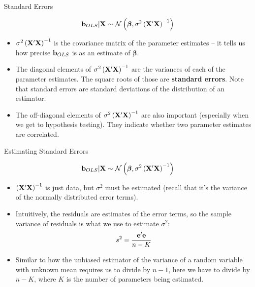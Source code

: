 \begin{frame}{Standard Errors}

\[
	{\bf b}_{OLS} | {\bf X} \sim \mathcal{N}\left(\boldsymbol{\beta},\sigma^{2} \left({\bf X}'{\bf X}  \right)^{-1} \right)
	\]

\begin{itemize}
	\item $\sigma^{2} \left({\bf X}'{\bf X}  \right)^{-1}$ is the covariance matrix of the parameter estimates
	-- it tells us how precise ${\bf b}_{OLS}$ is as an estimate of $\boldsymbol{\beta}$.

	\item The diagonal elements of $\sigma^{2} \left({\bf X}'{\bf X}  \right)^{-1}$ are the variances of each of
	the parameter estimates. The square roots of those are {\bf standard errors}. Note that standard
	errors are standard deviations of the distribution of an estimator. 

	\item The off-diagonal elements of $\sigma^{2} \left({\bf X}'{\bf X}  \right)^{-1}$ are also important
	(especially when we get to hypothesis testing).
	They indicate whether two parameter estimates are correlated.

\end{itemize}
\end{frame}

\begin{frame}{Estimating Standard Errors}

\[
	{\bf b}_{OLS} | {\bf X} \sim \mathcal{N}\left(\boldsymbol{\beta},\sigma^{2} \left({\bf X}'{\bf X}  \right)^{-1} \right)
	\]

\begin{itemize}
	\item $\left({\bf X}'{\bf X}  \right)^{-1}$ is just data, but $\sigma^{2}$ must be estimated (recall that it's the 
	variance of the normally distributed error terms). 

	\item Intuitively, the residuals are estimates of the error terms, so the sample variance of residuals
	is what we use to estimate $\sigma^{2}$:\[
	s^{2} = \frac{{\bf e}'{\bf e}}{n-K}
	\]

	\item Similar to how the unbiased estimator of the variance of a random variable with unknown mean requires us to divide
	by $n-1$, here we have to divide by $n-K$, where $K$ is the number of parameters being estimated. 

	
\end{itemize}
\end{frame}


